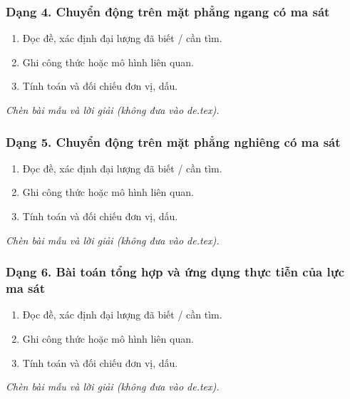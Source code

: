 \subsubsection{Dạng 4. Chuyển động trên mặt phẳng ngang có ma sát}
\begin{phuongphap}
\begin{enumerate}
\item Đọc đề, xác định đại lượng đã biết / cần tìm.
\item Ghi công thức hoặc mô hình liên quan.
\item Tính toán và đối chiếu đơn vị, dấu.
\end{enumerate}
\end{phuongphap}
\begin{vidumau}
\textit{Chèn bài mẫu và lời giải (không đưa vào de.tex).}
\end{vidumau}

\subsubsection{Dạng 5. Chuyển động trên mặt phẳng nghiêng có ma sát}
\begin{phuongphap}
\begin{enumerate}
\item Đọc đề, xác định đại lượng đã biết / cần tìm.
\item Ghi công thức hoặc mô hình liên quan.
\item Tính toán và đối chiếu đơn vị, dấu.
\end{enumerate}
\end{phuongphap}
\begin{vidumau}
\textit{Chèn bài mẫu và lời giải (không đưa vào de.tex).}
\end{vidumau}

\subsubsection{Dạng 6. Bài toán tổng hợp và ứng dụng thực tiễn của lực ma sát}
\begin{phuongphap}
\begin{enumerate}
\item Đọc đề, xác định đại lượng đã biết / cần tìm.
\item Ghi công thức hoặc mô hình liên quan.
\item Tính toán và đối chiếu đơn vị, dấu.
\end{enumerate}
\end{phuongphap}
\begin{vidumau}
\textit{Chèn bài mẫu và lời giải (không đưa vào de.tex).}
\end{vidumau}

